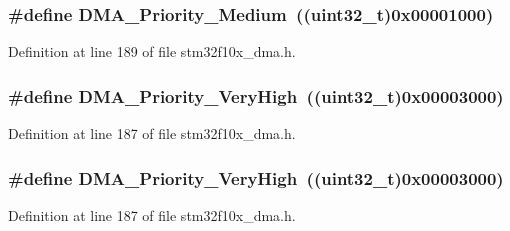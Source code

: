 \subsubsection[{\texorpdfstring{D\+M\+A\+\_\+\+Priority\+\_\+\+Medium}{DMA_Priority_Medium}}]{\setlength{\rightskip}{0pt plus 5cm}\#define D\+M\+A\+\_\+\+Priority\+\_\+\+Medium~(({\bf uint32\+\_\+t})0x00001000)}\hypertarget{group___d_m_a__priority__level_ga8e0d4a958f4288c6c759945789490f38}{}\label{group___d_m_a__priority__level_ga8e0d4a958f4288c6c759945789490f38}


Definition at line 189 of file stm32f10x\+\_\+dma.\+h.

\subsubsection[{\texorpdfstring{D\+M\+A\+\_\+\+Priority\+\_\+\+Very\+High}{DMA_Priority_VeryHigh}}]{\setlength{\rightskip}{0pt plus 5cm}\#define D\+M\+A\+\_\+\+Priority\+\_\+\+Very\+High~(({\bf uint32\+\_\+t})0x00003000)}\hypertarget{group___d_m_a__priority__level_gadccd2f8b2ac24ba4fd485dd5b9b48671}{}\label{group___d_m_a__priority__level_gadccd2f8b2ac24ba4fd485dd5b9b48671}


Definition at line 187 of file stm32f10x\+\_\+dma.\+h.

\subsubsection[{\texorpdfstring{D\+M\+A\+\_\+\+Priority\+\_\+\+Very\+High}{DMA_Priority_VeryHigh}}]{\setlength{\rightskip}{0pt plus 5cm}\#define D\+M\+A\+\_\+\+Priority\+\_\+\+Very\+High~(({\bf uint32\+\_\+t})0x00003000)}\hypertarget{group___d_m_a__priority__level_gadccd2f8b2ac24ba4fd485dd5b9b48671}{}\label{group___d_m_a__priority__level_gadccd2f8b2ac24ba4fd485dd5b9b48671}


Definition at line 187 of file stm32f10x\+\_\+dma.\+h.

